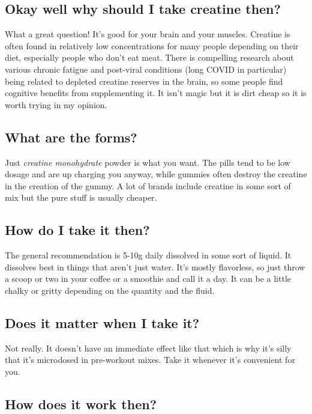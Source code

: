 \documentclass{article}
\begin{document}
\subsection{Okay well why should I take creatine then?}

What a great question! It’s good for your brain and your muscles. Creatine is often found in relatively low concentrations for many people depending on their diet, especially people who don’t eat meat. There is compelling research about various chronic fatigue and post-viral conditions (long COVID in particular) being related to depleted creatine reserves in the brain, so some people find cognitive benefits from supplementing it. It isn’t magic but it is dirt cheap so it is worth trying in my opinion.

\subsection{What are the forms?}

Just \textit{creatine monohydrate} powder is what you want. The pills tend to be low dosage and are up charging you anyway, while gummies often destroy the creatine in the creation of the gummy. A lot of brands include creatine in some sort of mix but the pure stuff is usually cheaper.

\subsection{How do I take it then?}

The general recommendation is 5-10g daily dissolved in some sort of liquid. It dissolves best in things that aren’t just water. It’s mostly flavorless, so just throw a scoop or two in your coffee or a smoothie and call it a day. It can be a little chalky or gritty depending on the quantity and the fluid.

\subsection{Does it matter when I take it?}

Not really. It doesn’t have an immediate effect like that which is why it’s silly that it’s microdosed in pre-workout mixes. Take it whenever it’s convenient for you.

\subsection{How does it work then?}
\end{document}
